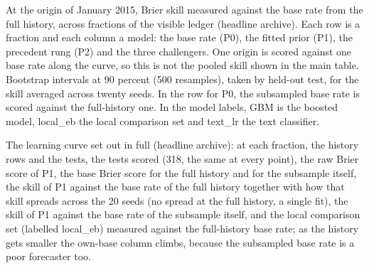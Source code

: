 \begin{table}[t]\centering\scriptsize
\caption{At the origin of January 2015, Brier skill measured against the base rate from the full history, across fractions of the visible ledger (headline archive). Each row is a fraction and each column a model: the base rate (P0), the fitted prior (P1), the precedent rung (P2) and the three challengers. One origin is scored against one base rate along the curve, so this is not the pooled skill shown in the main table. Bootstrap intervals at 90 percent (500 resamples), taken by held-out test, for the skill averaged across twenty seeds. In the row for P0, the subsampled base rate is scored against the full-history one. In the model labels, GBM is the boosted model, local\_eb the local comparison set and text\_lr the text classifier.}
\label{tab:learning-upworthy}
\resizebox{\textwidth}{!}{}
\end{table}

\clearpage

\begin{table}[t]\centering\scriptsize
\caption{The learning curve set out in full (headline archive): at each fraction, the history rows and the tests, the tests scored (318, the same at every point), the raw Brier score of P1, the base Brier score for the full history and for the subsample itself, the skill of P1 against the base rate of the full history together with how that skill spreads across the 20 seeds (no spread at the full history, a single fit), the skill of P1 against the base rate of the subsample itself, and the local comparison set (labelled local\_eb) measured against the full-history base rate; as the history gets smaller the own-base column climbs, because the subsampled base rate is a poor forecaster too.}
\label{tab:learning-detail}
\resizebox{\textwidth}{!}{}
\end{table}


